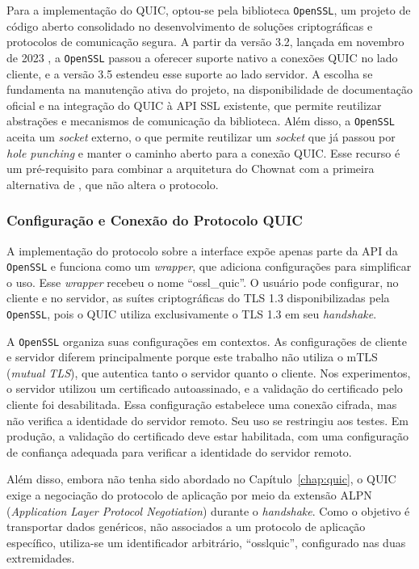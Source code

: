 Para a implementação do QUIC, optou-se pela biblioteca \texttt{OpenSSL}, um projeto de código aberto consolidado no desenvolvimento de soluções criptográficas e protocolos de comunicação segura. A partir da versão 3.2, lançada em novembro de 2023 \citep{openssl_quic}, a \texttt{OpenSSL} passou a oferecer suporte nativo a conexões QUIC no lado cliente, e a versão 3.5 estendeu esse suporte ao lado servidor. A escolha se fundamenta na manutenção ativa do projeto, na disponibilidade de documentação oficial e na integração do QUIC à API SSL existente, que permite reutilizar abstrações e mecanismos de comunicação da biblioteca. Além disso, a \texttt{OpenSSL} aceita um \textit{socket} externo, o que permite reutilizar um \textit{socket} que já passou por \textit{hole punching} e manter o caminho aberto para a conexão QUIC. Esse recurso é um pré-requisito para combinar a arquitetura do Chownat com a primeira alternativa de \citet{draft-seemann-quic-nat-traversal}, que não altera o protocolo.

\subsubsection{Configuração e Conexão do Protocolo QUIC}

A implementação do protocolo sobre a interface expõe apenas parte da API da \texttt{OpenSSL} e funciona como um \textit{wrapper}, que adiciona configurações para simplificar o uso. Esse \textit{wrapper} recebeu o nome ``ossl\_quic''. O usuário pode configurar, no cliente e no servidor, as suítes criptográficas do TLS 1.3 disponibilizadas pela \texttt{OpenSSL}, pois o QUIC utiliza exclusivamente o TLS 1.3 em seu \textit{handshake}.

A \texttt{OpenSSL} organiza suas configurações em contextos. As configurações de cliente e servidor diferem principalmente porque este trabalho não utiliza o mTLS (\textit{mutual TLS}), que autentica tanto o servidor quanto o cliente. Nos experimentos, o servidor utilizou um certificado autoassinado, e a validação do certificado pelo cliente foi desabilitada. Essa configuração estabelece uma conexão cifrada, mas não verifica a identidade do servidor remoto. Seu uso se restringiu aos testes. Em produção, a validação do certificado deve estar habilitada, com uma configuração de confiança adequada para verificar a identidade do servidor remoto.

Além disso, embora não tenha sido abordado no Capítulo~\ref{chap:quic}, o QUIC exige a negociação do protocolo de aplicação por meio da extensão ALPN (\textit{Application Layer Protocol Negotiation}) durante o \textit{handshake}. Como o objetivo é transportar dados genéricos, não associados a um protocolo de aplicação específico, utiliza-se um identificador arbitrário, ``osslquic'', configurado nas duas extremidades.

